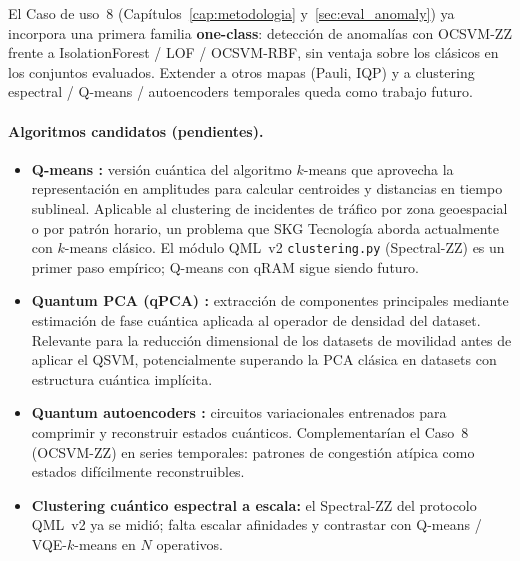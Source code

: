 El Caso de uso~8 (Capítulos~\ref{cap:metodologia} y~\ref{sec:eval_anomaly}) ya incorpora una primera familia \textbf{one-class}: detección de anomalías con OCSVM-ZZ frente a IsolationForest / LOF / OCSVM-RBF, sin ventaja sobre los clásicos en los conjuntos evaluados. Extender a otros mapas (Pauli, IQP) y a clustering espectral / Q-means / autoencoders temporales queda como trabajo futuro.

\paragraph{Algoritmos candidatos (pendientes).}
\begin{itemize}
  \item \textbf{Q-means \citep{kerenidis2019qmeans}:} versión cuántica del algoritmo $k$-means que aprovecha la representación en amplitudes para calcular centroides y distancias en tiempo sublineal. Aplicable al clustering de incidentes de tráfico por zona geoespacial o por patrón horario, un problema que SKG Tecnología aborda actualmente con $k$-means clásico. El módulo QML~v2 \texttt{clustering.py} (Spectral-ZZ) es un primer paso empírico; Q-means con qRAM sigue siendo futuro.

  \item \textbf{Quantum PCA (qPCA) \citep{lloyd2014}:} extracción de componentes principales mediante estimación de fase cuántica aplicada al operador de densidad del dataset. Relevante para la reducción dimensional de los datasets de movilidad antes de aplicar el QSVM, potencialmente superando la PCA clásica en datasets con estructura cuántica implícita.

  \item \textbf{Quantum autoencoders \citep{romero2017}:} circuitos variacionales entrenados para comprimir y reconstruir estados cuánticos. Complementarían el Caso~8 (OCSVM-ZZ) en series temporales: patrones de congestión atípica como estados difícilmente reconstruibles.

  \item \textbf{Clustering cuántico espectral a escala:} el Spectral-ZZ del protocolo QML~v2 ya se midió; falta escalar afinidades y contrastar con Q-means / VQE-$k$-means en $N$ operativos.
\end{itemize}

